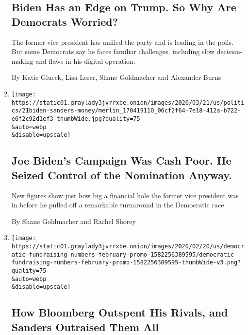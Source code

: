 \begin{enumerate}
  \hypertarget{biden-has-an-edge-on-trump-so-why-are-democrats-worried}{%
  \subsection{Biden Has an Edge on Trump. So Why Are Democrats
  Worried?}\label{biden-has-an-edge-on-trump-so-why-are-democrats-worried}}

  The former vice president has unified the party and is leading in the
  polls. But some Democrats say he faces familiar challenges, including
  slow decision-making and flaws in his digital operation.

  By Katie Glueck, Lisa Lerer, Shane Goldmacher and Alexander Burns
\item
  \href{/2020/03/21/us/politics/biden-sanders-fund-raising.html}{}

  \texttt{[image: https://static01.graylady3jvrrxbe.onion/images/2020/03/21/us/politics/21biden-sanders-money/merlin\_170419110\_06cf2f64-7e18-412a-b722-e6f2c92d1ef3-thumbWide.jpg?quality=75\\\&auto=webp\\\&disable=upscale]}

  \hypertarget{joe-bidens-campaign-was-cash-poor-he-seized-control-of-the-nomination-anyway}{%
  \subsection{Joe Biden's Campaign Was Cash Poor. He Seized Control of
  the Nomination
  Anyway.}\label{joe-bidens-campaign-was-cash-poor-he-seized-control-of-the-nomination-anyway}}

  New figures show just how big a financial hole the former vice
  president was in before he pulled off a remarkable turnaround in the
  Democratic race.

  By Shane Goldmacher and Rachel Shorey
\item
  \href{/interactive/2020/02/21/us/politics/democratic-fundraising-numbers-february.html}{}

  \texttt{[image: https://static01.graylady3jvrrxbe.onion/images/2020/02/20/us/democratic-fundraising-numbers-february-promo-1582256389595/democratic-fundraising-numbers-february-promo-1582256389595-thumbWide-v3.png?quality=75\\\&auto=webp\\\&disable=upscale]}

  \hypertarget{how-bloomberg-outspent-his-rivals-and-sanders-outraised-them-all}{%
  \subsection{How Bloomberg Outspent His Rivals, and Sanders Outraised
  Them
  All}\label{how-bloomberg-outspent-his-rivals-and-sanders-outraised-them-all}}


\end{enumerate}
